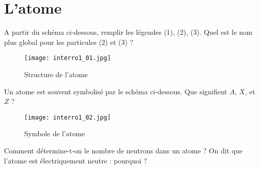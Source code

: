 \documentclass{exam}
\begin{document}
\section*{L'atome}

\begin{questions}
  \question[1] A partir du schéma ci-dessous, remplir les légendes (1), (2), (3). Quel est le nom plus global pour les particules (2) et (3) ?

  \begin{figure}[H]
    \centering
    \texttt{[image: interro1\_01.jpg]}
    \caption{Structure de l'atome}
  \end{figure}

  \question[1] Un atome est souvent symbolisé par le schéma ci-dessous. Que signifient $A$, $X$, et $Z$ ?

  \begin{figure}[H]
    \centering
    \texttt{[image: interro1\_02.jpg]}
    \caption{Symbole de l'atome}
  \end{figure}

  \question[1] Comment détermine-t-on le nombre de neutrons dans un atome ?
  \question[0.5] On dit que l'atome est électriquement neutre : pourquoi ?

  
\end{questions}
\end{document}
